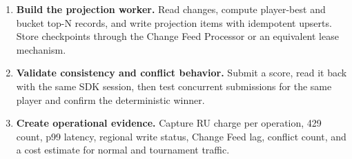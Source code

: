 \begin{enumerate}
\begin{lstlisting}[language=Python,caption={Submitting leaderboard scores with deterministic IDs and synthetic partition keys.},label={lst:ch3-capstone-python-submit}]
def board_shard(game_id, season_id, region, player_id, buckets=64):
    bucket = abs(hash(player_id)) % buckets
    return f"{game_id}#{season_id}#{region}#{bucket:02d}"

def submit_score(game_id, season_id, region, player_id, match_id, attempt, value):
    timestamp = datetime.now(timezone.utc).isoformat()
    item = {
        "id": f"score_{player_id}_{match_id}_{attempt}",
        "type": "scoreSubmission",
        "gameId": game_id,
        "seasonId": season_id,
        "region": region,
        "playerId": player_id,
        "matchId": match_id,
        "attempt": attempt,
        "score": value,
        "submittedAt": timestamp,
        "boardShard": board_shard(game_id, season_id, region, player_id),
    }
    return scores.upsert_item(item)

for i in range(10):
    saved = submit_score("racer", "2026-summer", "americas", f"player_{i}", "m77", 1, 1000 + i)
    print(saved["id"], saved["boardShard"])
\end{lstlisting}

    \item \textbf{Build the projection worker.} Read changes, compute player-best and bucket top-N records, and write projection items with idempotent upserts. Store checkpoints through the Change Feed Processor or an equivalent lease mechanism.
    \item \textbf{Validate consistency and conflict behavior.} Submit a score, read it back with the same SDK session, then test concurrent submissions for the same player and confirm the deterministic winner.
    \item \textbf{Create operational evidence.} Capture RU charge per operation, 429 count, p99 latency, regional write status, Change Feed lag, conflict count, and a cost estimate for normal and tournament traffic.
\end{enumerate}

